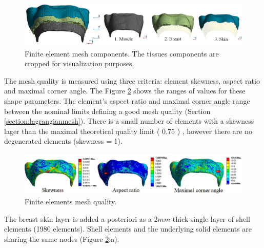  \begin{figure}[!h]
\centering
\includegraphics[width=1\textwidth,keepaspectratio]{figures/mesh3components.png} 
\caption{ Finite element mesh components. The tissues components are cropped for visualization purposes. }\label{fig:meshcomponents}
\end{figure}
 
 The mesh quality is measured using three criteria: element skewness, aspect ratio and maximal corner angle. The Figure \ref{fig:meshquality} shows the ranges of values for these shape parameters. The element's aspect ratio and maximal corner angle range between the nominal limits defining a good mesh quality (Section \ref{section:lagrangianmesh}). There is a small number of elements with a skewness lager than the maximal theoretical quality limit ( 0.75 ) , however there are no degenerated elements (skewness = 1).  

\begin{figure}[!h]
\centering
\includegraphics[width=1\textwidth,keepaspectratio]{figures/meshquality.jpg} 
\caption{ Finite elements mesh quality.}\label{fig:meshquality}
\end{figure}




The breast skin layer is added a posteriori   as a $2mm$ thick single layer of shell elements (1980 elements). Shell elements and the underlying solid elements are sharing the same nodes (Figure \ref{fig:meshquality}.a).



